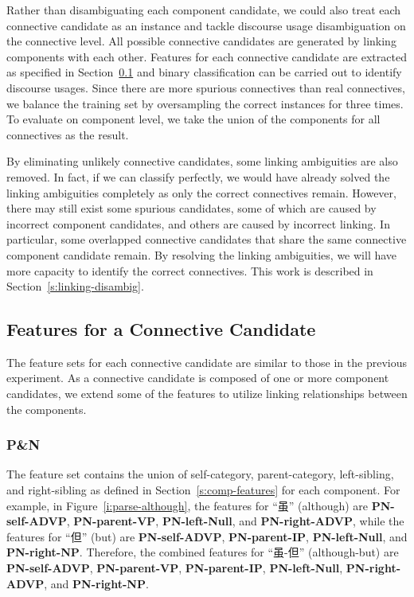 Rather than disambiguating each component candidate, we could also treat each connective
candidate as an instance and tackle discourse usage disambiguation on the connective
level. All possible connective candidates are  generated by linking components with
each other. Features for each connective candidate are extracted as specified in
Section~\ref{s:connective-features} and binary
classification can be carried out to identify discourse usages.
Since there are more spurious connectives than real connectives, we balance the
training set by oversampling the correct instances for three times. To evaluate on
component level, we take the union of the components for all connectives as the result.

By eliminating unlikely connective candidates, some linking ambiguities 
are also removed. In fact, if we can classify perfectly, we would have already
solved the linking ambiguities completely as only the correct connectives remain.
However, there may still exist some spurious candidates, some of which are
caused by incorrect component candidates, and others are caused by
incorrect linking.
In particular, some overlapped connective candidates that share the same
connective component candidate remain. By resolving the linking
ambiguities, we will have more capacity to identify the correct connectives. This
work is described in Section~\ref{s:linking-disambig}.

\subsection{Features for a Connective Candidate}
\label{s:connective-features}

The feature sets for each connective candidate are similar to those in the previous
experiment. As a connective candidate is composed of one or more component candidates,
we extend some of the features to utilize linking relationships between the
components.

\subsubsection{P\&N}

The feature set contains the union of self-category, parent-category, left-sibling,
and right-sibling as defined in Section~\ref{s:comp-features} for each component.
For example, in Figure~\ref{i:parse-although}, the features for ``虽'' (although) are
\textbf{PN-self-ADVP}, \textbf{PN-parent-VP}, \textbf{PN-left-Null}, and \textbf{PN-right-ADVP}, while
the features for ``但'' (but) are \textbf{PN-self-ADVP}, \textbf{PN-parent-IP}, \textbf{PN-left-Null},
and \textbf{PN-right-NP}. Therefore, the combined features for ``虽-但'' (although-but) are
\textbf{PN-self-ADVP}, \textbf{PN-parent-VP}, \textbf{PN-parent-IP}, \textbf{PN-left-Null},
\textbf{PN-right-ADVP}, and \textbf{PN-right-NP}.


